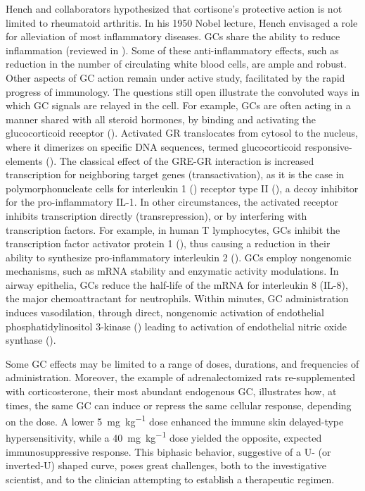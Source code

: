 \documentclass[12pt,english]{report}\usepackage[]{graphicx}\usepackage[]{color}
\begin{document}
Hench and collaborators hypothesized that cortisone's protective action
is not limited to rheumatoid arthritis. In his 1950 Nobel lecture,
Hench envisaged a role for alleviation of most inflammatory diseases.
GCs share the ability to reduce inflammation (reviewed in \citep{clark2007anti-inflammatory,coutinho2011anti-inflammatory}).
Some of these anti-inflammatory effects, such as reduction in the
number of circulating white blood cells, are ample and robust. Other
aspects of GC action remain under active study, facilitated by the
rapid progress of immunology. The questions still open illustrate
the convoluted ways in which GC signals are relayed in the cell. For
example, GCs are often acting in a manner shared with all steroid
hormones, by binding and activating the glucocorticoid receptor ().
Activated GR translocates from cytosol to the nucleus, where it dimerizes
on specific DNA sequences, termed glucocorticoid responsive-elements
()\citep{truss1990contacts}.
The classical effect of the GRE-GR interaction is increased transcription
for neighboring target genes (transactivation), as it is the case
in polymorphonucleate cells for interleukin 1 ()
receptor type II ()\citep{re1994type},
a decoy inhibitor for the pro-inflammatory IL-1. In other circumstances,
the activated receptor inhibits transcription directly (transrepression),
or by interfering with transcription factors. For example, in human
T lymphocytes, GCs inhibit the transcription factor activator protein
1 (), thus causing a reduction
in their ability to synthesize pro-inflammatory interleukin 2 ()\citep{paliogianni1993negative}.
GCs employ nongenomic mechanisms, such as mRNA stability and enzymatic
activity modulations. In airway epithelia, GCs reduce the half-life
of the mRNA for interleukin 8 (IL-8), the major chemoattractant for
neutrophils\citep{chang2001mechanism}. Within minutes, GC administration
induces vasodilation, through direct, nongenomic activation of endothelial
phosphatidylinositol 3-kinase ()
leading to activation of endothelial nitric oxide synthase ()\citep{hafezi-moghadam2002acute}.

Some GC effects may be limited to a range of doses, durations, and
frequencies of administration. Moreover, the example of adrenalectomized
rats re-supplemented with corticosterone, their most abundant endogenous
GC, illustrates how, at times, the same GC can induce or repress the
same cellular response, depending on the dose. A lower \SI{5}{\milli\gram\per\kilo\gram}
dose enhanced the immune skin delayed-type hypersensitivity, while
a \SI{40}{\milli\gram\per\kilo\gram} dose yielded the opposite, expected
immunosuppressive response\citep{dhabhar1999enhancing}. This biphasic
behavior, suggestive of a U- (or inverted-U) shaped curve, poses great
challenges, both to the investigative scientist, and to the clinician
attempting to establish a therapeutic regimen.
\end{document}
